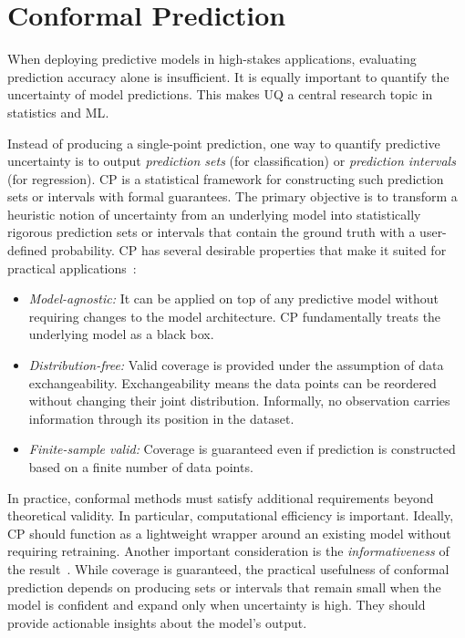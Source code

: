 \section{Conformal Prediction}
\label{sec:conformal_prediction}
When deploying predictive models in high-stakes applications, evaluating prediction accuracy alone is insufficient. It is equally important to quantify the uncertainty of model predictions. This makes \gls{UQ} a central research topic in statistics and \gls{ML}.

Instead of producing a single-point prediction, one way to quantify predictive uncertainty is to output \textit{prediction sets} (for classification) or \textit{prediction intervals} (for regression). \gls{CP} is a statistical framework for constructing such prediction sets or intervals with formal guarantees. The primary objective is to transform a heuristic notion of uncertainty from an underlying model into statistically rigorous prediction sets or intervals that contain the ground truth with a user-defined probability. \gls{CP} has several desirable properties that make it suited for practical applications~\cite{Shafer-ConformalPrediction-2008, Angelopoulus-ConformalPrediction-2023, Zhou-ConformalPredictionDataPerspective-2025}:
\begin{itemize}
    \item \textit{Model-agnostic:} It can be applied on top of any predictive model without requiring changes to the model architecture. \gls{CP} fundamentally treats the underlying model as a black box.
    \item \textit{Distribution-free:} Valid coverage is provided under the assumption of data exchangeability. Exchangeability means the data points can be reordered without changing their joint distribution. Informally, no observation carries information through its position in the dataset.
    \item \textit{Finite-sample valid:} Coverage is guaranteed even if prediction is constructed based on a finite number of data points.
\end{itemize}

In practice, conformal methods must satisfy additional requirements beyond theoretical validity. In particular, computational efficiency is important. Ideally, \gls{CP} should function as a lightweight wrapper around an existing model without requiring retraining. Another important consideration is the \textit{informativeness} of the result~\cite{Zhou-ConformalPredictionDataPerspective-2025}. While coverage is guaranteed, the practical usefulness of conformal prediction depends on producing sets or intervals that remain small when the model is confident and expand only when uncertainty is high. They should provide actionable insights about the model's output.

